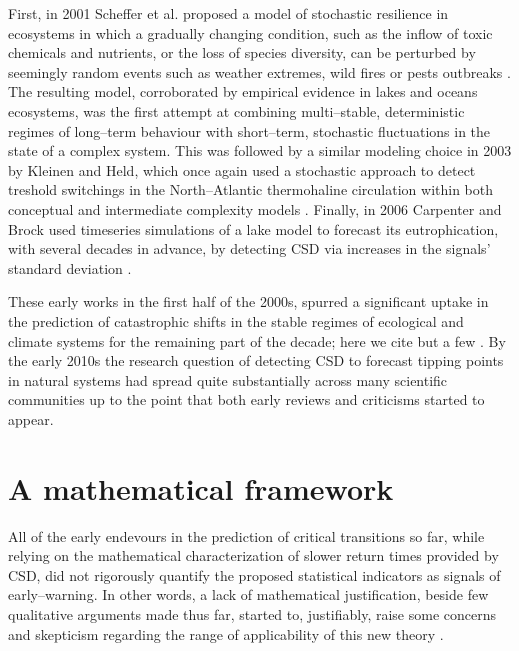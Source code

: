 First, in 2001 Scheffer et al. proposed a model of stochastic resilience in ecosystems in which a gradually changing condition, such as the inflow of toxic chemicals and nutrients, or the loss of species diversity, can be perturbed by seemingly random events such as weather extremes, wild fires or pests outbreaks \cite{Scheffer2001}. 
The resulting model, corroborated by empirical evidence in lakes and oceans ecosystems, was the first attempt at combining multi--stable, deterministic regimes of long--term behaviour with short--term, stochastic fluctuations in the state of a complex system.
This was followed by a similar modeling choice in 2003 by Kleinen and Held, which once again used a stochastic approach to detect treshold switchings in the North--Atlantic thermohaline circulation within both conceptual \cite{Kleinen2003} and intermediate complexity models \cite{Held2004}.
Finally, in 2006 Carpenter and Brock used timeseries simulations of a lake model to forecast its eutrophication, with several decades in advance, by detecting CSD via increases in the signals' standard deviation \cite{Carpenter2006}.

These early works in the first half of the 2000s, spurred a significant uptake in the prediction of catastrophic shifts in the stable regimes of ecological and climate systems for the remaining part of the decade; here we cite but a few \cite{Livina2007,vanNes2007,Carpenter2008,Dakos2008,Guttal2008,Biggs2009,Chisholm2009,Guttal2008,Brock2010,Carpenter2010,Dakos2010,Drake2010}.
By the early 2010s the research question of detecting CSD to forecast tipping points in natural systems had spread quite substantially across many scientific communities up to the point that both early reviews \cite{Scheffer2009,Scheffer2012} and criticisms \cite{Hastings2010,Ditlevsen2010} started to appear.

\section{A mathematical framework}\label{sec:framework}
All of the early endevours in the prediction of critical transitions so far, while relying on the mathematical characterization of slower return times provided by CSD, did not rigorously quantify the proposed statistical indicators as signals of early--warning.
In other words, a lack of mathematical justification, beside few qualitative arguments made thus far, started to, justifiably, raise some concerns and skepticism regarding the range of applicability of this new theory \cite{Boettiger2013,Boerlijst2013,Kefi2013,Bos2014}.

